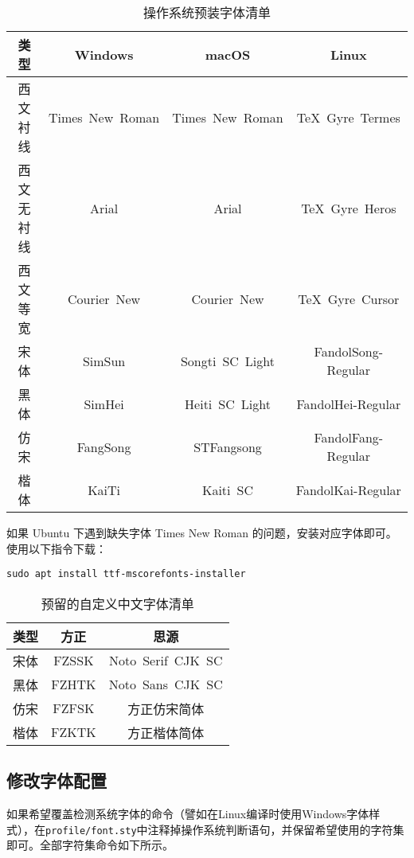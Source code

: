 \begin{table}[htbp]
    \caption{操作系统预装字体清单}
    \label{tab:defaultfontset}
    \begin{tabular}{cccc}
        \toprule
        类型 & Windows & macOS & Linux \\
        \midrule
        西文衬线 & Times~New~Roman & Times~New~Roman & TeX~Gyre~Termes \\
        西文无衬线 & Arial & Arial & TeX~Gyre~Heros \\
        西文等宽 & Courier~New & Courier~New & TeX~Gyre~Cursor \\
        宋体 & SimSun & Songti~SC~Light &FandolSong-Regular \\
        黑体 & SimHei & Heiti~SC~Light & FandolHei-Regular \\
        仿宋 & FangSong & STFangsong & FandolFang-Regular \\
        楷体 & KaiTi & Kaiti~SC & FandolKai-Regular \\
        \bottomrule
    \end{tabular}
\end{table}

如果 Ubuntu 下遇到缺失字体 Times New Roman 的问题，安装对应字体即可。使用以下指令下载：
\begin{lstlisting}
sudo apt install ttf-mscorefonts-installer
\end{lstlisting}

\begin{table}[htbp]
    \caption{预留的自定义中文字体清单}
    \label{tab:userfontset}
    \begin{tabular}{ccc}
        \toprule
        类型 & 方正 & 思源 \\
        \midrule
        宋体 & FZSSK & Noto~Serif~CJK~SC \\
        黑体 & FZHTK & Noto~Sans~CJK~SC \\
        仿宋 & FZFSK & 方正仿宋简体 \\
        楷体 & FZKTK & 方正楷体简体 \\
        \bottomrule
    \end{tabular}
\end{table}

\subsection{修改字体配置}

如果希望覆盖检测系统字体的命令（譬如在Linux编译时使用Windows字体样式），在\texttt{profile/font.sty}中注释掉操作系统判断语句，并保留希望使用的字符集即可。全部字符集命令如下所示。

